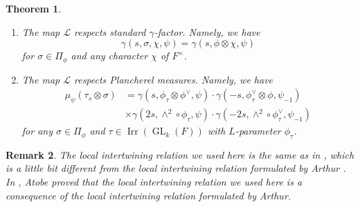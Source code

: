 \documentclass[article]{article}
\numberwithin{equation}{section}
\newtheorem{theorem}{Theorem}[section]
\newtheorem{remark}[theorem]{Remark}
\theoremstyle{definition}
\DeclareMathOperator{\GL}{GL}
\DeclareMathOperator{\SP}{Sp}
\DeclareMathOperator{\Irr}{Irr}
\begin{document}
\begin{theorem}
\begin{enumerate}[(1).]
		where $Q$ is a parabolic subgroup of $\SP(W_{2n})$ with Levi subgroup $M_{Q}\cong \GL_{k_{1}}(F) \times \cdots \times \GL_{k_{r}}(F) \times \SP(W_{2n_0})$ and $\sigma_{0}$ runs over elements of $\Pi_{\phi_{0}}(\SP(W_{2n_0}))$. Moreover, the natural embedding $\mathcal S_{\phi_0}\hookrightarrow  \mathcal S_{\phi}$ is an isomorphism and $$\mathcal J_{\mathfrak W^\prime_{\psi,c}}(\sigma)=\mathcal J_{\mathfrak W^\prime_{\psi,c}}(\sigma_0)$$ if we identify $\mathcal S_{\phi_0}$ with $\mathcal S_{\phi}$ via the above isomorphism. 
		\item
		The map $\mathcal L$ respects standard $\gamma$-factor. Namely, we have 
		$$
		\gamma(s,\sigma,\chi,\psi)=\gamma(s,\phi\otimes\chi,\psi)
		$$
		for $\sigma\in \Pi_{\phi}$ and any character $\chi$ of $F^{\times}$.
		\item 
		The map $\mathcal L$ respects Plancherel measures. Namely, we have 
		\begin{align*}
		\mu_{\psi}(\tau_s\otimes \sigma)&=\gamma(s,\phi_{\tau}\otimes \phi^{ \vee},\psi)\cdot \gamma(-s,\phi_{\tau}^{\vee}\otimes\phi, \psi_{-1} )\\
		& \times \gamma (2s, \wedge^2\circ \phi_{\tau}, \psi)\cdot \gamma(-2s, \wedge^{2} \circ \phi_{\tau}^{\vee},\psi_{-1})
		\end{align*}
		for any $\sigma\in \Pi_{\phi}$ and $\tau\in \Irr (\GL_k(F))$ with $L$-parameter $\phi_{\tau}$. 
	\end{enumerate}
\end{theorem}
\begin{remark}
	The local intertwining relation we used here is the same as in \cite[\S 6.6]{MR3788848}, which is a little bit different from the local intertwining relation formulated by Arthur \cite[\S 2.4]{MR3135650}. In \cite{MR3801418}, Atobe proved that the local intertwining relation we used here is a consequence of the local intertwining relation formulated by Arthur. 
\end{remark}



\end{document}
